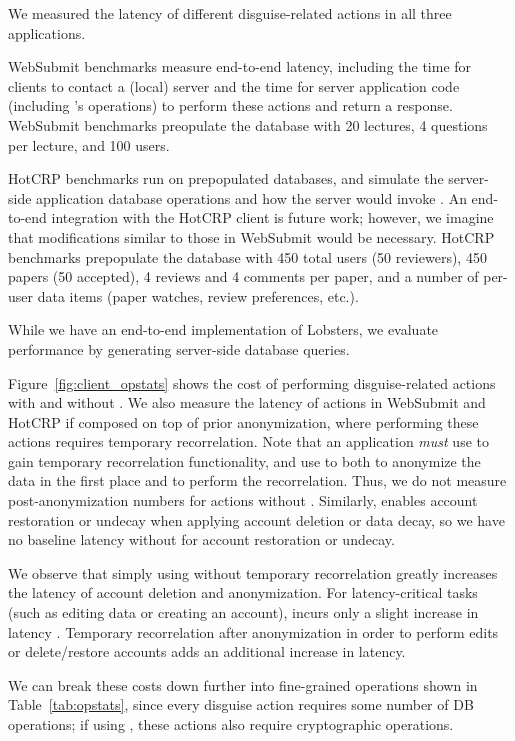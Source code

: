 We measured the latency of different disguise-related actions in all three applications.

WebSubmit benchmarks measure end-to-end latency, including the time for clients to contact a (local)
server and the time for server application code (including \sys's operations) to perform these
actions and return a response.
%
WebSubmit benchmarks preopulate the database with 20 lectures, 4 questions per lecture, and 100
users.

HotCRP benchmarks run on prepopulated databases, and simulate the server-side application database
operations and how the server would invoke \sys.  An end-to-end integration with the HotCRP client
is future work; however, we imagine that modifications similar to those in WebSubmit would be
necessary.
%
HotCRP benchmarks prepopulate the database with 450 total users (50 reviewers), 450 papers (50
accepted), 4 reviews and 4 comments per paper, and a number of per-user data items (\eg paper
watches, review preferences, etc.).  

While we have an end-to-end implementation of Lobsters, we evaluate performance by generating
server-side database queries.

%
%
Figure~\ref{fig:client_opstats} shows the cost of performing disguise-related actions with and
without \sys. We also measure the latency of actions in WebSubmit and HotCRP if composed on top of
prior anonymization, where performing these actions requires temporary recorrelation. Note that an
application \emph{must} use \sys to gain temporary recorrelation functionality, and use \sys to both
to anonymize the data in the first place and to perform the recorrelation. Thus, we do not measure
post-anonymization numbers for actions without \sys. Similarly, \sys enables account restoration or
undecay when applying account deletion or data decay, so we have no baseline latency without \sys
for account restoration or undecay.

We observe that simply using \sys without temporary recorrelation greatly increases the latency of
account deletion and anonymization.  For latency-critical tasks (such as editing data or creating an
account), \sys incurs only a slight increase in latency . Temporary recorrelation
after anonymization in order to perform edits or delete/restore accounts adds an additional
 increase in latency.

We can break these costs down further into fine-grained operations shown in 
Table~\ref{tab:opstats}, since every disguise action requires some number of DB operations; if using
\sys, these actions also require cryptographic operations.

